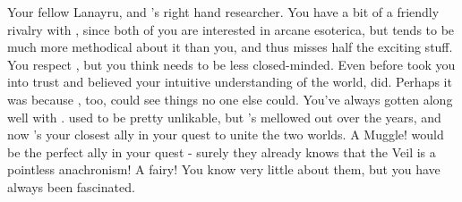 \documentclass[char]{Katmeers}
\begin{document}
\begin{contacts}
	\contact{\cHermione{}} Your fellow Lanayru, and \cHarry{}'s right hand researcher. You have a bit of a friendly rivalry with \cHermione{\them}, since both of you are interested in arcane esoterica, but \cHermione{\they} tends to be much more methodical about it than you, and thus misses half the exciting stuff. You respect \cHermione{\them}, but you think \cHermione{\they} needs to be less closed-minded.
	\contact{\cCrabbe{}} Even before \cHarry{} took you into \cHarry{\their} trust and believed your intuitive understanding of the world, \cCrabbe{} did.  Perhaps it was because \cCrabbe{\they}, too, could see things no one else could. You've always gotten along well with \cCrabbe{\them}.
	\contact{\cMalfoy{}} \cMalfoy{} used to be pretty unlikable, but \cMalfoy{\they}'s mellowed out over the years, and now \cMalfoy{\they}'s your closest ally in your quest to unite the two worlds.
	\contact{\cHarry{\MYname}} A Muggle! \cHarry{\they} would be the perfect ally in your quest - surely \cHarry{} they already knows that the Veil is a pointless anachronism!
	\contact{\cFairy{}} A fairy! You know very little about them, but you have always been fascinated.
\end{contacts}
\end{document}
